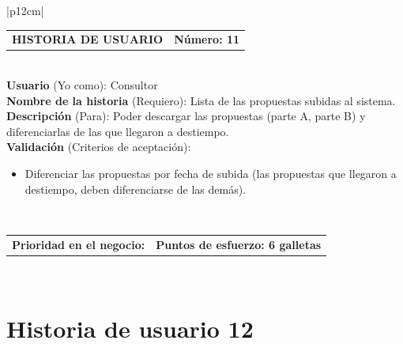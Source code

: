 \documentclass[11pt,letterpaper]{report}
\begin{document}
	\begin{center}	
		\begin{tabular}{|p{12cm}|}
			\hline
			\begin{tabular}{c|c}
				\textbf{HISTORIA DE USUARIO} & \textbf{Número: 11} \\
			\end{tabular} \\ \hline
			\textbf{Usuario} (Yo como): Consultor \\ \hline
			\textbf{Nombre de la historia} (Requiero): Lista de las propuestas subidas al sistema. \\ \hline
			\textbf{Descripción} (Para): Poder descargar las propuestas (parte A, parte B) y diferenciarlas de las que llegaron a destiempo. \\ \hline
			\textbf{Validación} (Criterios de aceptación): \\
			\begin{minipage}{12cm}
				\begin{itemize}
					\item Diferenciar las propuestas por fecha de subida (las propuestas que llegaron a destiempo, deben diferenciarse de las demás).
				\end{itemize}
			\end{minipage} \\ \hline
			\begin{tabular}{p{6cm}|c}
				\textbf{Prioridad en el negocio: } & \textbf{Puntos de esfuerzo: 6 galletas} \\
			\end{tabular} \\ \hline
		\end{tabular}
	\end{center}
	
	\section{Historia de usuario 12}
	
\end{document}
